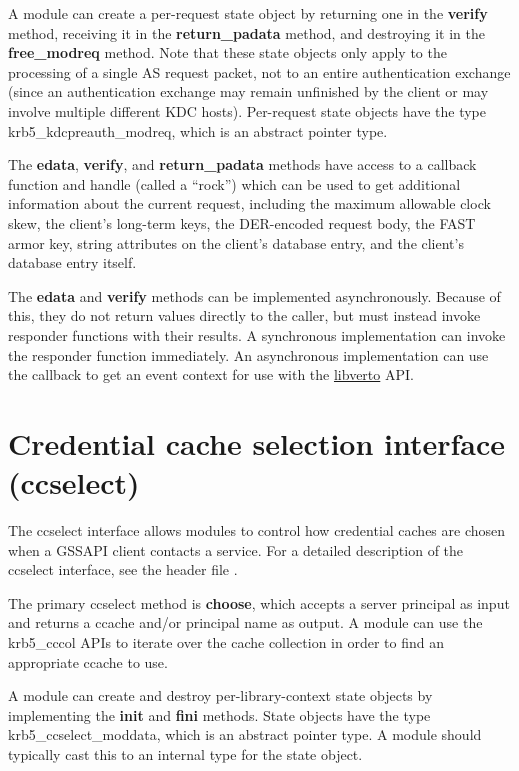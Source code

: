 \documentclass[letterpaper,10pt,english]{sphinxmanual}
\begin{document}
A module can create a per-request state object by returning one in the
\textbf{verify} method, receiving it in the \textbf{return\_padata} method, and
destroying it in the \textbf{free\_modreq} method.  Note that these state
objects only apply to the processing of a single AS request packet,
not to an entire authentication exchange (since an authentication
exchange may remain unfinished by the client or may involve multiple
different KDC hosts).  Per-request state objects have the type
krb5\_kdcpreauth\_modreq, which is an abstract pointer type.

The \textbf{edata}, \textbf{verify}, and \textbf{return\_padata} methods have access
to a callback function and handle (called a ``rock'') which can be used
to get additional information about the current request, including the
maximum allowable clock skew, the client's long-term keys, the
DER-encoded request body, the FAST armor key, string attributes on the
client's database entry, and the client's database entry itself.

The \textbf{edata} and \textbf{verify} methods can be implemented
asynchronously.  Because of this, they do not return values directly
to the caller, but must instead invoke responder functions with their
results.  A synchronous implementation can invoke the responder
function immediately.  An asynchronous implementation can use the
callback to get an event context for use with the \href{https://fedorahosted.org/libverto/}{libverto} API.


\section{Credential cache selection interface (ccselect)}
\label{plugindev/ccselect:credential-cache-selection-interface-ccselect}\label{plugindev/ccselect::doc}\label{plugindev/ccselect:ccselect-plugin}
The ccselect interface allows modules to control how credential caches
are chosen when a GSSAPI client contacts a service.  For a detailed
description of the ccselect interface, see the header file
.

The primary ccselect method is \textbf{choose}, which accepts a server
principal as input and returns a ccache and/or principal name as
output.  A module can use the krb5\_cccol APIs to iterate over the
cache collection in order to find an appropriate ccache to use.

A module can create and destroy per-library-context state objects by
implementing the \textbf{init} and \textbf{fini} methods.  State objects have
the type krb5\_ccselect\_moddata, which is an abstract pointer type.  A
module should typically cast this to an internal type for the state
object.
\end{document}
